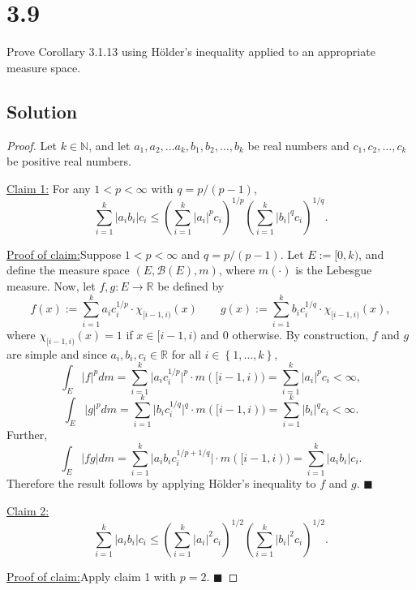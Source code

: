 \documentclass[12pt]{article}
\newenvironment{claimproof}[1]{\par\noindent\underline{Proof of claim:}\space#1}{\hfill $\blacksquare$\vspace{5mm}}
\begin{document}
\newpage 
\section*{3.9}
Prove Corollary 3.1.13 using H{\"o}lder's inequality applied to an appropriate measure space.

\subsection*{Solution}
\begin{proof}
Let $k \in \mathbb{N}$, and let $a_{1}, a_{2}, \hdots a_{k}, b_{1}, b_{2}, \hdots, b_{k}$ be real numbers and $c_{1}, c_{2}, \hdots, c_{k}$ be
positive real numbers.

\underline{Claim 1:} For any $1 < p < \infty$ with $q = p / (p-1)$,
\[ \sum_{i=1}^{k}|a_{i}b_{i}|c_{i} \leq \left( \sum_{i=1}^{k}|a_{i}|^{p}c_{i} \right)^{1/p}\left( \sum_{i=1}^{k}|b_{i}|^{q}c_{i} \right)^{1/q}. \]
\begin{claimproof}
Suppose $1 < p < \infty$ and $q = p / (p-1)$. Let $E := [0,k)$, and define the measure space $(E, \mathcal{B}(E), m)$, where $m(\cdot)$ is the
Lebesgue measure. Now, let $f,g : E\rightarrow \mathbb{R}$ be defined by 
\[ f(x) := \sum_{i=1}^{k}a_{i}c_{i}^{1/p}\cdot \chi_{[i-1,i)}(x) \qquad g(x) := \sum_{i=1}^{k}b_{i}c_{i}^{1/q}\cdot \chi_{[i-1,i)}(x),\]
where $\chi_{[i-1,i)}(x) = 1$ if $x \in [i-1,i)$ and 0 otherwise. By construction, $f$ and $g$ are simple and since $a_{i}, b_{i}, c_{i} \in
\mathbb{R}$ for all $i \in \left\{ 1,\hdots, k \right\}$,
\[ \int_{E}|f|^{p}dm = \sum_{i=1}^{k}\big|a_{i}c_{i}^{1/p}\big|^{p}\cdot m([i-1,i)) = \sum_{i=1}^{k}|a_{i}|^{p}c_{i} < \infty, \]
\[ \int_{E}|g|^{p}dm = \sum_{i=1}^{k}\big|b_{i}c_{i}^{1/q}\big|^{q}\cdot m([i-1,i)) = \sum_{i=1}^{k}|b_{i}|^{q}c_{i} < \infty. \]
Further, 
\[ \int_{E}|fg|dm = \sum_{i=1}^{k}\big|a_{i}b_{i}c_{i}^{1/p + 1/q}\big|\cdot m([i-1,i)) = \sum_{i=1}^{k}|a_{i}b_{i}|c_{i}. \]
Therefore the result follows by applying H{\"o}lder's inequality to $f$ and $g$.
\end{claimproof}

\underline{Claim 2:}
\[ \sum_{i=1}^{k}|a_{i}b_{i}|c_{i} \leq \left( \sum_{i=1}^{k}|a_{i}|^{2}c_{i} \right)^{1/2}\left( \sum_{i=1}^{k}|b_{i}|^{2}c_{i} \right)^{1/2}. \]
\begin{claimproof}
Apply claim 1 with $p = 2$.
\end{claimproof}

\end{proof}
\end{document}
